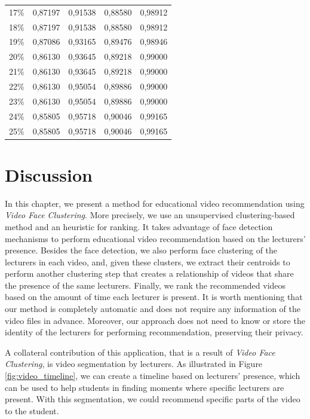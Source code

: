 \begin{table}[!ht]
\begin{tabular}{ccccc}
17\%               & 0,87197         & 0,91538        & 0,88580         & 0,98912   \\
18\%               & 0,87197         & 0,91538        & 0,88580         & 0,98912   \\
19\%               & 0,87086         & 0,93165        & 0,89476         & 0,98946   \\
20\%               & 0,86130         & 0,93645        & 0,89218         & 0,99000   \\
21\%               & 0,86130         & 0,93645        & 0,89218         & 0,99000   \\
22\%               & 0,86130         & 0,95054        & 0,89886         & 0,99000   \\
23\%               & 0,86130         & 0,95054        & 0,89886         & 0,99000   \\
24\%               & 0,85805         & 0,95718        & 0,90046         & 0,99165   \\
25\%               & 0,85805         & 0,95718        & 0,90046         & 0,99165  
\end{tabular}
\end{table}

\section{Discussion}
\label{sec:recommendation_discussion}

In this chapter, we present a method for educational video recommendation using \emph{Video Face Clustering}. More precisely, we use an unsupervised clustering-based method and an heuristic for ranking.
It takes advantage of face detection mechanisms to perform educational video recommendation based on the lecturers' presence.
Besides the face detection, we also perform face clustering of the lecturers in each video, and, given these clusters, we extract their centroids to perform another clustering step that creates a relationship of videos that share the presence of the same lecturers.
Finally, we rank the recommended videos based on the amount of time each lecturer is present.
It is worth mentioning that our method is completely automatic and does not require any information of the video files in advance.  
Moreover, our approach does not need to know or store the identity of the lecturers for performing recommendation, preserving their privacy.

A collateral contribution of this application, that is a result of \emph{Video Face Clustering}, is video segmentation by lecturers.
As illustrated in Figure \ref{fig:video_timeline}, we can create a timeline based on lecturers' presence, which can be used to help students in finding moments where specific lecturers are present.
With this segmentation, we could recommend specific parts of the video to the student.


